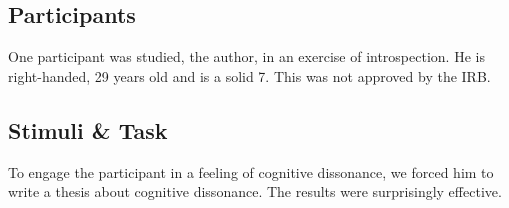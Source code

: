 \subsection{Participants}
One participant was studied, the author, in an exercise of introspection. He is right-handed, 29 years old and is a solid 7. This was not approved by the IRB.

\subsection{Stimuli {\&} Task}
To engage the participant in a feeling of cognitive dissonance, we forced him to write a thesis about cognitive dissonance. The results were surprisingly effective.
